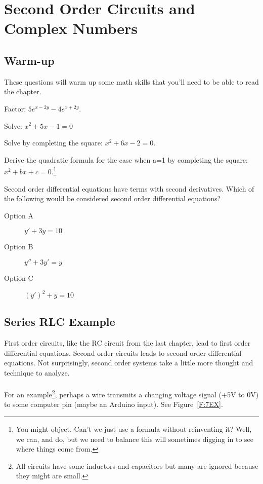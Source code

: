 \chapter{Second Order Circuits and Complex Numbers}
\section{Warm-up}
These questions will warm up some math skills that you'll need to be able to read the chapter. 
\begin{blevel}
Factor: $5e^{x-2y}-4e^{x+2y}$.
\end{blevel}

\begin{alevel}
Solve: $x^2+ 5x - 1 = 0$
\end{alevel}

\begin{blevel}
Solve by completing the square: $x^2+6x-2 = 0$.
\end{blevel}

\begin{clevel}
Derive the quadratic formula for the case when a=1 by completing the square: $x^2+bx+c = 0$.\footnote{You might object. Can't we just use a formula without reinventing it? Well, we can, and do, but we need to balance this will sometimes digging in to see where things come from.}
\end{clevel}

\begin{blevel}
Second order differential equations have terms with second derivatives. Which of the following would be considered second order differential equations?
\begin{description}
\item[Option A] $y'+3y=10$
\item[Option B] $y''+3y'=y$
\item[Option C] $(y')^2+y=10$
\end{description}
\end{blevel}

\section{Series RLC Example}
First order circuits, like the RC circuit from the last chapter, lead to first order differential equations. Second order circuits leads to second order differential equations. Not surprisingly, second order systems take a little more thought and technique to analyze. \\
\\
For an example\footnote{All circuits have some inductors and capacitors but many are ignored because they might are small.}, perhaps a wire transmits a changing voltage signal (+5V to 0V) to some computer pin (maybe an Arduino input). See Figure~\ref{F:7EX}.

